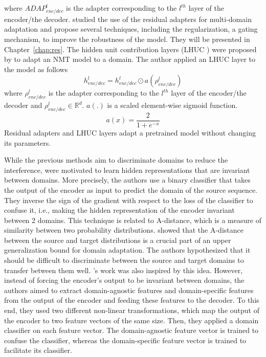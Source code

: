 where $ADAP_{enc/dec}^l$ is the adapter corresponding to the $l^{th}$ layer of the encoder/the decoder. \citet{Pham20Study} studied the use of the residual adapters for multi-domain adaptation and propose several techniques, including the regularization, a gating mechanism, to improve the robustness of the model. They will be presented in Chapter~\ref{chap:res}. The hidden unit contribution layers (LHUC ) were proposed by \citet{Vilar18learning} to adapt an NMT model to a domain. The author applied an LHUC layer to the model as follows
\begin{equation}
h_{enc/dec}^l = h_{enc/dec}^{l} \odot a(\rho^{l}_{enc/dec})
\end{equation}
where $\rho^{l}_{enc/dec}$ is the adapter corresponding to the $l^{th}$ layer of the encoder/the decoder and $\rho^{l}_{enc/dec} \in \mathbb{R}^d$. $a(.)$ is a scaled
element-wise sigmoid function.
$$a(x) = \frac{2}{1+e^{-x}}$$
Residual adapters and LHUC layers adapt a pretrained model without changing its parameters. 

While the previous methods aim to discriminate domains to reduce the interference, \citet{Britz17effective} were motivated to learn hidden representations that are invariant between domains. More precisely, the authors use a binary classifier that takes the output of the encoder as input to predict the domain of the source sequence. They inverse the sign of the gradient with respect to the loss of the classifier to confuse it, i.e., making the hidden representation of the encoder invariant between 2 domains. This technique is related to A-distance, which is a measure of similarity between two probability distributions. \citet{Ben07analysis} showed that the A-distance between the source and target distributions is a crucial part of an upper generalization bound for domain adaptation. The authors hypothesized that it should be difficult to discriminate between the source and target domains to transfer between them well. \citet{Zeng18multidomain}'s work was also inspired by this idea. However, instead of forcing the encoder's output to be invariant between domains, the authors aimed to extract domain-agnostic features and domain-specific features from the output of the encoder and feeding these features to the decoder. To this end, they used two different non-linear transformations, which map the output of the encoder to two feature vectors of the same size. Then, they applied a domain classifier on each feature vector. The domain-agnostic feature vector is trained to confuse the classifier, whereas the domain-specific feature vector is trained to facilitate its classifier.

